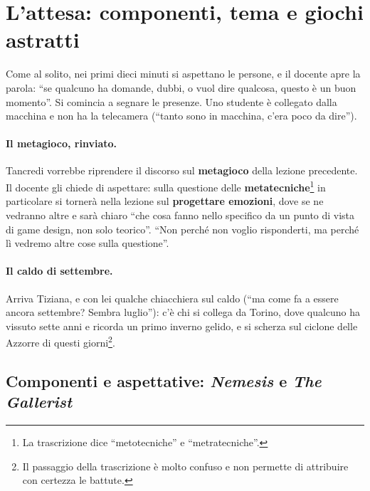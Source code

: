 \section{L'attesa: componenti, tema e giochi astratti}
\label{a4:sec:attesa}

Come al solito, nei primi dieci minuti si aspettano le persone, e il docente apre
la parola: ``se qualcuno ha domande, dubbi, o vuol dire qualcosa, questo è un buon
momento''. Si comincia a segnare le presenze. Uno studente è collegato dalla
macchina e non ha la telecamera (``tanto sono in macchina, c'era poco da dire'').

\paragraph{Il metagioco, rinviato.} Tancredi vorrebbe riprendere il discorso sul
\textbf{metagioco} della lezione precedente. Il docente gli chiede di aspettare: sulla
questione delle \textbf{metatecniche}\footnote{La trascrizione dice
``metotecniche'' e ``metratecniche''.} in particolare si tornerà nella lezione
sul \textbf{progettare emozioni}, dove se ne vedranno altre e sarà chiaro ``che
cosa fanno nello specifico da un punto di vista di game design, non solo
teorico''. ``Non perché non voglio risponderti, ma perché lì vedremo altre cose
sulla questione''.

\paragraph{Il caldo di settembre.} Arriva Tiziana, e con lei qualche chiacchiera
sul caldo (``ma come fa a essere ancora settembre? Sembra luglio''): c'è chi si
collega da Torino, dove qualcuno ha vissuto sette anni e ricorda un primo inverno
gelido, e si scherza sul ciclone delle Azzorre di questi giorni\footnote{Il
passaggio della trascrizione è molto confuso e non permette di attribuire con
certezza le battute.}.

\subsection{Componenti e aspettative: \emph{Nemesis} e \emph{The Gallerist}}

